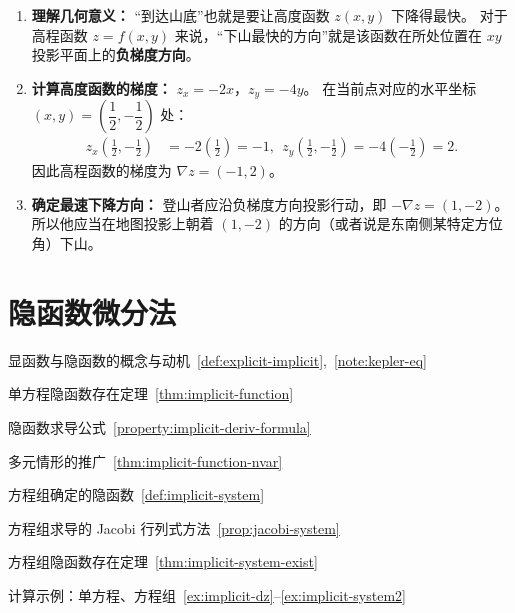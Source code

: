 \documentclass[lang=cn,11pt]{elegantbook}
\begin{document}
\begin{solution}
\begin{enumerate}
  \item \textbf{理解几何意义：}
  “到达山底”也就是要让高度函数 $z(x,y)$ 下降得最快。
  对于高程函数 $z = f(x,y)$ 来说，“下山最快的方向”就是该函数在所处位置在 $xy$ 投影平面上的\textbf{负梯度方向}。

  \item \textbf{计算高度函数的梯度：}
  $z_x = -2x$，$z_y = -4y$。
  在当前点对应的水平坐标 $(x,y) = \left(\dfrac{1}{2}, -\dfrac{1}{2}\right)$ 处：
  \begin{align*}
  z_x\left(\frac{1}{2}, -\frac{1}{2}\right) &= -2\left(\frac{1}{2}\right) = -1, ~~
  z_y\left(\frac{1}{2}, -\frac{1}{2}\right) = -4\left(-\frac{1}{2}\right) = 2.
  \end{align*}
  因此高程函数的梯度为 $\nabla z = (-1, 2)$。

  \item \textbf{确定最速下降方向：}
  登山者应沿负梯度方向投影行动，即 $-\nabla z = (1, -2)$。
  所以他应当在地图投影上朝着 \textbf{$(1,-2)$} 的方向（或者说是东南侧某特定方位角）下山。
\end{enumerate}
\end{solution}






\section{隐函数微分法}

\begin{introduction}
  \item 显函数与隐函数的概念与动机~\ref{def:explicit-implicit},~\ref{note:kepler-eq}
  \item 单方程隐函数存在定理~\ref{thm:implicit-function}
  \item 隐函数求导公式~\ref{property:implicit-deriv-formula}
  \item 多元情形的推广~\ref{thm:implicit-function-nvar}
  \item 方程组确定的隐函数~\ref{def:implicit-system}
  \item 方程组求导的 Jacobi 行列式方法~\ref{prop:jacobi-system}
  \item 方程组隐函数存在定理~\ref{thm:implicit-system-exist}
  \item 计算示例：单方程、方程组~\ref{ex:implicit-dz}--\ref{ex:implicit-system2}
\end{introduction}
\end{document}
